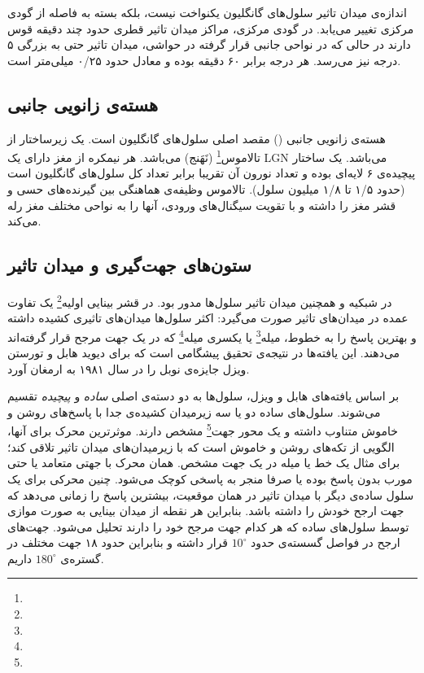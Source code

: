 اندازه‌ی میدان تاثیر سلول‌های گانگلیون یکنواخت نیست، بلکه بسته به فاصله از گودی مرکزی تغییر می‌یابد. در گودی مرکزی، مراکز میدان تاثیر قطری حدود چند دقیقه قوس دارند در حالی که در نواحی جانبی قرار گرفته در حواشی، میدان تاثیر حتی به بزرگی ۵ درجه نیز می‌رسد. هر درجه برابر ۶۰ دقیقه بوده و معادل حدود ۰/۲۵ میلی‌متر است.




\subsection{هسته‌ی زانویی جانبی}
هسته‌ی زانویی جانبی () مقصد اصلی سلول‌های گانگلیون است.  یک زیرساختار از تالاموس\footnote{} (نَهَنج) می‌باشد. هر نیمکره از مغز دارای یک LGN می‌باشد.  یک ساختار پیچیده‌ی ۶ لایه‌ای بوده و تعداد نورون آن تقریبا برابر تعداد کل سلول‌های گانگلیون است (حدود ۱/۵ تا ۱/۸ میلیون سلول). تالاموس وظیفه‌ی هماهنگی بین گیرنده‌های حسی و قشر مغز را داشته و با تقویت سیگنال‌های ورودی، آنها را به نواحی مختلف مغز رله می‌کند. 

\subsection{ستون‌های جهت‌گیری و میدان تاثیر }
در شبکیه و همچنین  میدان تاثیر سلول‌ها مدور بود. در قشر بینایی اولیه\footnote{} یک تفاوت عمده در میدان‌های تاثیر صورت می‌گیرد: اکثر سلول‌ها میدان‌های تاثیری کشیده داشته و بهترین پاسخ را به خطوط، میله\footnote{} یا یکسری میله\footnote{} که در یک جهت مرجح قرار گرفته‌اند می‌دهند. این یافته‌ها در نتیجه‌ی تحقیق پیشگامی است که برای دیوید هابل و تورستن ویزل جایزه‌ی نوبل را در سال ۱۹۸۱ به ارمغان آورد\cite{TJP19621601106}. 

بر اساس یافته‌های هابل و ویزل، سلول‌ها به دو دسته‌ی اصلی \textit{ساده} و \textit{پیچیده} تقسیم می‌شوند. سلول‌های ساده دو یا سه زیرمیدان کشیده‌ی جدا با پاسخ‌های روشن و خاموش متناوب داشته و یک محور جهت\footnote{} مشخص دارند. موثرترین محرک برای آنها، الگویی از تکه‌های روشن و خاموش است که با زیرمیدان‌های میدان تاثیر تلاقی کند؛ برای مثال یک خط یا میله در یک جهت مشخص. همان محرک با جهتی متعامد یا حتی مورب بدون پاسخ بوده یا صرفا منجر به پاسخی کوچک می‌شود. چنین محرکی برای یک سلول ساده‌ی دیگر با میدان تاثیر در همان موقعیت، بیشترین پاسخ را زمانی می‌دهد که جهت ارجح خودش را داشته باشد. بنابراین هر نقطه از میدان بینایی به صورت موازی توسط سلول‌های ساده که هر کدام جهت مرجح خود را دارند تحلیل می‌شود. جهت‌های ارجح در فواصل گسسته‌ی حدود $10^{\circ}$ قرار داشته و بنابراین حدود ۱۸ جهت مختلف در گستره‌ی $180^{\circ}$ داریم.

